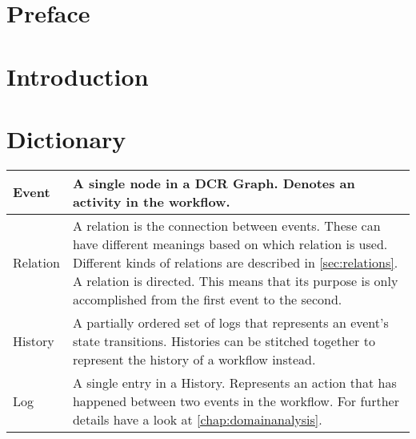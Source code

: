 \chapter{Preface}

\chapter{Introduction}

\chapter{Dictionary}
\begin{table}[H]
	\begin{tabularx}{\linewidth}{l X}
		Event\index{Event} & A single node in a DCR Graph. Denotes an activity in the workflow.\\\hline
		Relation & A relation is the connection between events. These can have different meanings based on which relation is used. Different kinds of relations are described in \autoref{sec:relations}. A relation is directed. This means that its purpose is only accomplished from the first event to the second.\todo[inline]{Skal det stå her?}\\\hline
		History\index{History} & A partially ordered set of logs that represents an event's state transitions. Histories can be stitched together to represent the history of a workflow instead.\\\hline
		Log\index{Log}\index{Log entry} & A single entry in a History. Represents an action that has happened between two events in the workflow. For further details have a look at \autoref{chap:domainanalysis}.\\
	\end{tabularx}
\end{table}